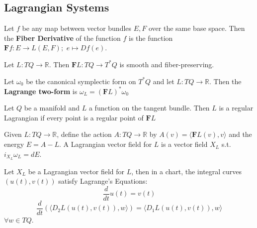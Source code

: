 \documentclass{article}
\begin{document}
\subsection{Lagrangian Systems}

\begin{defn}

Let $f$ be any map between vector bundles $E,F$ over the same base space. Then the \textbf{Fiber Derivative} of the function $f$ is the function $\textbf{F}f:E \to L(E,F); \hspace{4pt} e \mapsto Df(e)$.

\end{defn}

\begin{prop}

Let $L: TQ \to \mathbb{R}$. Then $\textbf{F}L:TQ \to T^*Q$ is smooth and fiber-preserving.

\end{prop}

\begin{defn}

Let $\omega_0$ be the canonical symplectic form on $T^*Q$ and let $L: TQ \to \mathbb{R}$. Then the \textbf{Lagrange two-form} is $\omega_L = (\textbf{F}L)^* \omega_0$

\end{defn}

\begin{defn}

Let $Q$ be a manifold and $L$ a function on the tangent bundle. Then $L$ is a regular Lagrangian if every point is a regular point of $\textbf{F}L$

\end{defn}

\begin{defn}

Given $L:TQ \to \mathbb{R}$, define the action $A: TQ \to \mathbb{R}$ by $A(v) = \langle \textbf{F}L(v), v\rangle $ and the energy $E = A - L$. A Lagrangian vector field for $L$ is a vector field $X_L$ s.t. $i_{X_L} \omega_L = dE$.

\end{defn}

\begin{thm}

Let $X_L$ be a  Lagrangian vector field for $L$, then in a chart, the integral curves $(u(t), v(t))$ satisfy Lagrange's Equations:
\[\frac{d}{dt}u(t) = v(t)\]
\[\frac{d}{dt}\left( \langle D_2 L(u(t),v(t)), w\rangle  \right) = \langle D_1 L(u(t),v(t)),w\rangle \]
$\forall w \in TQ$.

\end{thm}
\end{document}
